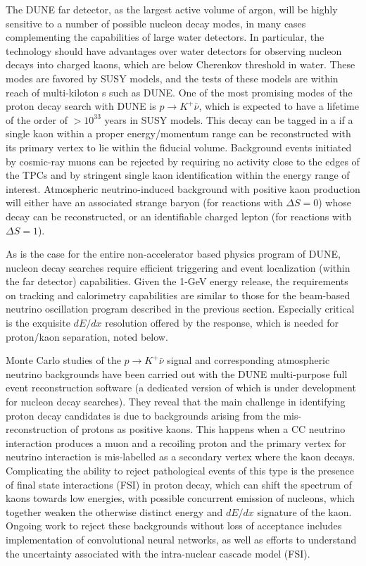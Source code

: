 The DUNE far detector, as the largest active volume of argon, will be highly sensitive to a number of possible nucleon decay modes, in many cases complementing the capabilities of large water detectors.  In particular, the \lartpc technology should have advantages over water detectors for observing nucleon decays into charged kaons, which are below Cherenkov threshold in water. These modes are favored by SUSY models, and the tests of these models are within reach of multi-kiloton \lartpc{}s such as DUNE. One of the most promising modes of the proton decay search with DUNE is $p\to K^+ \bar{\nu}$, which is expected to have a lifetime of the order of $>10^{33}$ years in SUSY models. This decay can be tagged in a \lartpc if a single kaon within a proper energy/momentum range can be reconstructed with its primary vertex to lie within the fiducial volume. Background events initiated by cosmic-ray muons can be rejected by requiring no activity close to the edges of the TPCs and by stringent single kaon identification within the energy range of interest. Atmospheric neutrino-induced background with positive kaon production will either have an associated strange baryon (for reactions with $\Delta S = 0$) whose decay can be reconstructed, or an identifiable charged lepton (for reactions with $\Delta S = 1$). 

As is the case for the entire non-accelerator based physics program of DUNE, nucleon decay searches require efficient triggering and event localization (within the far detector) capabilities.  Given the 1-GeV energy release, the requirements on tracking and calorimetry capabilities are similar to those for the beam-based neutrino oscillation program described in the previous section.  Especially critical is the exquisite $dE/dx$ resolution offered by the \lartpc response, which is needed for proton/kaon separation, noted below.

Monte Carlo studies of the $p\to K^+ \bar{\nu}$ signal and corresponding atmospheric neutrino backgrounds have been carried out with the DUNE multi-purpose full event reconstruction software (a dedicated version of which is under development for nucleon decay searches).  They reveal that the main challenge in identifying proton decay candidates is due to backgrounds arising from the mis-reconstruction of protons as positive kaons. This happens when a CC neutrino interaction produces a muon and a recoiling proton and the primary vertex for neutrino interaction is mis-labelled as a secondary vertex where the kaon decays.  Complicating the ability to reject pathological events of this type is the presence of final state interactions (FSI) in proton decay, which can shift the spectrum of kaons towards low energies, with possible concurrent emission of nucleons, which together weaken the otherwise distinct energy and $dE/dx$ signature of the kaon. Ongoing work to reject these backgrounds without loss of acceptance includes implementation of convolutional neural networks, as well as efforts to understand the uncertainty associated with the intra-nuclear cascade model (FSI). 

